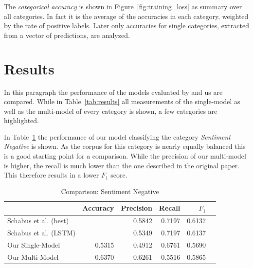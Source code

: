 \documentclass[11pt,a4paper]{article}
\begin{document}
The \textit{categorical accuracy} is shown in Figure~\ref{fig:training_loss} as summary over all categories. In fact it is the average of the accuracies in each category, weighted by the rate of positive labels. Later only accuracies for single categories, extracted from a vector of predictions, are analyzed.


\section{Results}

In this paragraph the performance of the models evaluated by  and us are compared.
While in Table~\ref{tab:results} all measurements of the single-model as well as the multi-model of every category is shown, a few categories are highlighted.

In Table~\ref{tab:results:sentiment_negative} the performance of our model classifying the category \textit{Sentiment Negative} is shown. As the corpus for this category is nearly equally balanced this is a good starting point for a comparison. 
While the precision of our multi-model is higher, the recall is much lower than the one described in the original paper. 
This therefore results in a lower $F_1$ score.
\begin{table}[h!]
	\centering\scriptsize
	\begin{tabular}{l r r r r r}
		& Accuracy & Precision & Recall & $F_1$ \\
		\hline
		Schabus et al. (best) & & 0.5842 & 0.7197 & 0.6137 \\
		Schabus et al. (LSTM) & & 0.5349 & 0.7197 & 0.6137 \\
		\hline
		Our Single-Model & 0.5315 & 0.4912 & 0.6761 & 0.5690 \\
		Our Multi-Model & 0.6370 & 0.6261 & 0.5516 & 0.5865 \\
	\end{tabular}  
	\caption{Comparison: Sentiment Negative}
	\label{tab:results:sentiment_negative}
\end{table}
\end{document}
